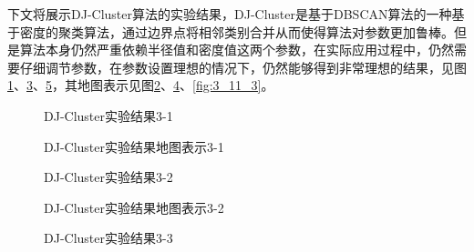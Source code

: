 \par 下文将展示DJ-Cluster算法的实验结果，DJ-Cluster是基于DBSCAN算法的一种基于密度的聚类算法，通过边界点将相邻类别合并从而使得算法对参数更加鲁棒。但是算法本身仍然严重依赖半径值和密度值这两个参数，在实际应用过程中，仍然需要仔细调节参数，在参数设置理想的情况下，仍然能够得到非常理想的结果，见图\ref{fig:3_10_1}、\ref{fig:3_10_2}、\ref{fig:3_10_3}，其地图表示见图\ref{fig:3_11_1}、\ref{fig:3_11_2}、\ref{fig:3_11_3}。
\begin{figure}[htb]
  \centering%
  \hspace{4em}%
  \caption{DJ-Cluster实验结果3-1}
  \label{fig:3_10_1}
\end{figure}
\begin{figure}[htb]
  \centering%
  \hspace{4em}%
  \caption{DJ-Cluster实验结果地图表示3-1}
  \label{fig:3_11_1}
\end{figure}
\begin{figure}[htb]
  \centering%
  \hspace{4em}%
  \caption{DJ-Cluster实验结果3-2}
  \label{fig:3_10_2}
\end{figure}
\begin{figure}[htb]
  \centering%
  \hspace{4em}%
  \caption{DJ-Cluster实验结果地图表示3-2}
  \label{fig:3_11_2}
\end{figure}
\begin{figure}[htb]
  \centering%
  \hspace{4em}%
  \caption{DJ-Cluster实验结果3-3}
  \label{fig:3_10_3}
\end{figure}
